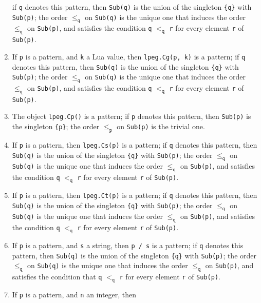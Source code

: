 \documentclass{article}
\begin{document}
\begin{enumerate}
  if \verb|q| denotes this pattern, then \verb|Sub(q)| is the union of
  the singleton \verb|{q}| with \verb|Sub(p)|; the order
  \(\leq_\mathtt{q}\) on \verb|Sub(q)| is the unique one that induces
  the order \(\leq_\mathtt{q}\) on \verb|Sub(p)|, and satisfies the
  condition \verb|q| \(<_\mathtt{q}\) \verb|r| for every element
  \verb|r| of \verb|Sub(p)|.
\item If \verb|p| is a pattern, and \verb|k| a Lua value, then
  \verb|lpeg.Cg(p, k)| is a pattern; if \verb|q| denotes this pattern,
  then \verb|Sub(q)| is the union of the singleton \verb|{q}| with
  \verb|Sub(p)|; the order \(\leq_\mathtt{q}\) on \verb|Sub(q)| is the
  unique one that induces the order \(\leq_\mathtt{q}\) on
  \verb|Sub(p)|, and satisfies the condition \verb|q| \(<_\mathtt{q}\)
  \verb|r| for every element \verb|r| of \verb|Sub(p)|.
\item The object \verb|lpeg.Cp()| is a pattern; if \verb|p| denotes
  this pattern, then \verb|Sub(p)| is the singleton \verb|{p}|; the
  order \(\leq_\mathtt{p}\) on \verb|Sub(p)| is the trivial one.
\item If \verb|p| is a pattern, then \verb|lpeg.Cs(p)| is a pattern;
  if \verb|q| denotes this pattern, then \verb|Sub(q)| is the union of
  the singleton \verb|{q}| with \verb|Sub(p)|; the order
  \(\leq_\mathtt{q}\) on \verb|Sub(q)| is the unique one that induces
  the order \(\leq_\mathtt{q}\) on \verb|Sub(p)|, and satisfies the
  condition \verb|q| \(<_\mathtt{q}\) \verb|r| for every element
  \verb|r| of \verb|Sub(p)|.
\item If \verb|p| is a pattern, then \verb|lpeg.Ct(p)| is a pattern;
  if \verb|q| denotes this pattern, then \verb|Sub(q)| is the union of
  the singleton \verb|{q}| with \verb|Sub(p)|; the order
  \(\leq_\mathtt{q}\) on \verb|Sub(q)| is the unique one that induces
  the order \(\leq_\mathtt{q}\) on \verb|Sub(p)|, and satisfies the
  condition \verb|q| \(<_\mathtt{q}\) \verb|r| for every element
  \verb|r| of \verb|Sub(p)|.
\item If \verb|p| is a pattern, and \verb|s| a string, then
  \verb|p / s| is a pattern; if \verb|q| denotes this pattern, then
  \verb|Sub(q)| is the union of the singleton \verb|{q}| with
  \verb|Sub(p)|; the order \(\leq_\mathtt{q}\) on \verb|Sub(q)| is the
  unique one that induces the order \(\leq_\mathtt{q}\) on
  \verb|Sub(p)|, and satisfies the condition that \verb|q|
  \(<_\mathtt{q}\) \verb|r| for every element \verb|r| of
  \verb|Sub(p)|.
\item If \verb|p| is a pattern, and \verb|n| an integer, then

\end{enumerate}
\end{document}
